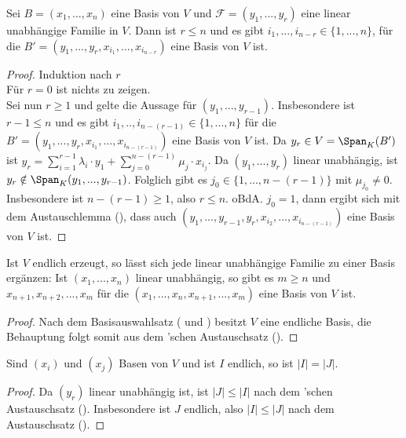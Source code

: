 \begin{theorem}
	Sei $B=(x_1,...,x_n)$ eine Basis von $V$ und $\mathcal F=(y_1,...
	,y_r)$ eine linear unabhängige Familie in $V$. Dann ist $r\le n$ und es gibt $i_1,...,i_{n-r} \in \{1,...,n\}$, für 
	die $B'=(y_1,...,y_r,x_{i_1},...,x_{i_{n-r}})$ eine Basis von $V$ ist. 
\end{theorem}
\begin{proof}
	Induktion nach $r$\\
	Für $r=0$ ist nichts zu zeigen. \\
	Sei nun $r\ge 1$ und gelte die Aussage für $(y_1,...,y_{r-1})$. Insbesondere ist $r-1\le n$ und es gibt $i_1,..,
	i_{n-(r-1)} \in \{1,...,n\}$ für die $B'=(y_1,...,y_r,x_{i_1},...,x_{i_{n-(r-1)}})$ eine Basis von $V$ ist. Da $y_r
	\in V=\Span_K(B')$ ist $y_r=\sum_{i=1}^{r-1} \lambda_i\cdot y_1 + \sum_{j=0}^{n-(r-1)} \mu_j\cdot 
	x_{i_j}$. Da $(y_1,...,y_r)$ linear unabhängig, ist $y_r \notin \Span_K(y_1,...,y_{r-1})$. Folglich gibt es $j_0 \in 
	\{1,...,n-(r-1)\}$ mit $\mu_{j_0}\neq 0$. Insbesondere ist $n-(r-1)\ge 1$, also $r\le n$. oBdA. $j_0=1$, dann 
	ergibt sich mit dem Austauschlemma (), dass auch $(y_1,...,y_{r-1},y_r,x_{i_2},...,x_{i_{n-(r-1)}})$ eine Basis von 
	$V$ ist.
\end{proof}

\begin{conclusion}[Basisergänzungssatz]
	Ist $V$ endlich erzeugt, so lässt sich jede linear unabhängige Familie zu einer Basis ergänzen: 
	Ist $(x_1,...,x_n)$ linear unabhängig, so gibt es $m\ge n$ und $x_{n+1},x_{n+2},...,x_m$ für die $(x_1,...,x_n,
	x_{n+1},...,x_m)$ eine Basis von $V$ ist.
\end{conclusion}
\begin{proof}
	Nach dem Basisauswahlsatz ( und ) besitzt $V$ eine endliche Basis, die Behauptung folgt somit aus dem 'schen Austauschsatz ().
\end{proof}

\begin{conclusion}
	Sind $(x_i)$ und $(x_j)$ Basen von $V$ und ist $I$ endlich, so ist $|I|=|J|$.
\end{conclusion}
\begin{proof}
	Da $(y_r)$ linear unabhängig ist, ist $|J|\le |I|$ nach dem 'schen Austauschsatz (). Insbesondere ist $J$ 
	endlich, also $|I|\le |J|$ nach dem Austauschsatz ().
\end{proof}

